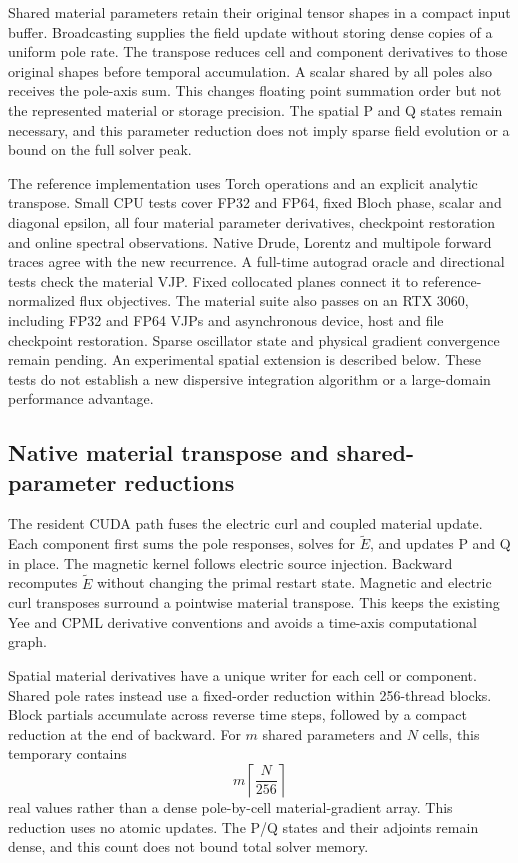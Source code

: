 \documentclass[11pt,a4paper]{article}
\begin{document}
Shared material parameters retain their original tensor shapes in a compact
input buffer. Broadcasting supplies the field update without storing dense
copies of a uniform pole rate. The transpose reduces cell and component
derivatives to those original shapes before temporal accumulation. A scalar
shared by all poles also receives the pole-axis sum. This changes floating
point summation order but not the represented material or storage precision.
The spatial P and Q states remain necessary, and this parameter reduction
does not imply sparse field evolution or a bound on the full solver peak.

The reference implementation uses Torch operations and an explicit analytic
transpose. Small CPU tests cover FP32 and FP64, fixed Bloch phase, scalar
and diagonal epsilon, all four material parameter derivatives, checkpoint
restoration and online spectral observations. Native Drude, Lorentz and
multipole forward traces agree with the new recurrence. A full-time
autograd oracle and directional tests check the material VJP. Fixed
collocated planes connect it to reference-normalized flux objectives.
The material suite also passes on an RTX 3060, including FP32 and FP64
VJPs and asynchronous device, host and file checkpoint restoration.
Sparse oscillator state and physical gradient convergence remain pending.
An experimental spatial extension is described below.
These tests do not establish a new dispersive integration algorithm or
a large-domain performance advantage.

\subsection{Native material transpose and shared-parameter reductions}
The resident CUDA path fuses the electric curl and coupled material update.
Each component first sums the pole responses, solves for
$\widetilde E$, and updates P and Q in place. The magnetic kernel follows
electric source injection. Backward recomputes $\widetilde E$ without
changing the primal restart state. Magnetic and electric curl transposes
surround a pointwise material transpose. This keeps the existing Yee and
CPML derivative conventions and avoids a time-axis computational graph.

Spatial material derivatives have a unique writer for each cell or
component. Shared pole rates instead use a fixed-order reduction within
256-thread blocks. Block partials accumulate across reverse time steps,
followed by a compact reduction at the end of backward. For $m$ shared
parameters and $N$ cells, this temporary contains
\begin{equation}
 m\left\lceil\frac{N}{256}\right\rceil
\end{equation}
real values rather than a dense pole-by-cell material-gradient array.
This reduction uses no atomic updates. The P/Q states and their adjoints
remain dense, and this count does not bound total solver memory.
\end{document}
